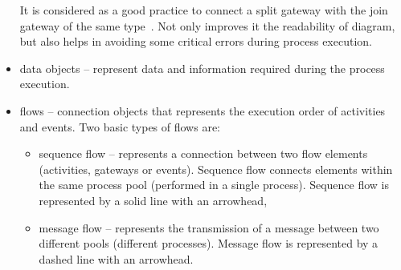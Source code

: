 \begin{itemize}
\begin{itemize}
	\end{itemize}
	It is considered as a good practice to connect a split gateway with the join gateway of the same type~\cite{pm-best-practices}. Not only improves it the readability of diagram, but also helps in avoiding some critical errors during process execution.
	\item data objects -- represent data and information required during the process execution.
	\item flows -- connection objects that represents the execution order of activities and events. Two basic types of flows are:
	\begin{itemize}
		\item sequence flow -- represents a connection between two flow elements (activities, gateways or events). Sequence flow connects elements within the same process pool (performed in a single process). Sequence flow is represented by a solid line with an arrowhead,
		\item message flow -- represents the transmission of a message between two different pools (different processes). Message flow is represented by a dashed line with an arrowhead.
	\end{itemize}
\end{itemize}

